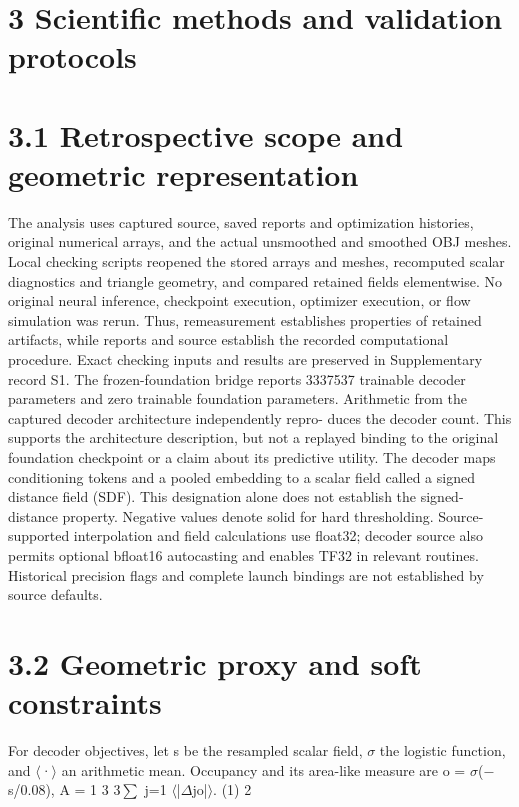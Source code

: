 \documentclass[11pt]{article}
\begin{document}
\section*{3 Scientific methods and validation protocols}


\section*{3.1 Retrospective scope and geometric representation}

The analysis uses captured source, saved reports and optimization histories, original numerical
arrays, and the actual unsmoothed and smoothed OBJ meshes. Local checking scripts reopened
the stored arrays and meshes, recomputed scalar diagnostics and triangle geometry, and compared
retained fields elementwise. No original neural inference, checkpoint execution, optimizer execution,
or flow simulation was rerun. Thus, remeasurement establishes properties of retained artifacts,
while reports and source establish the recorded computational procedure. Exact checking inputs
and results are preserved in Supplementary record S1.
The frozen-foundation bridge reports 3337537 trainable decoder parameters and zero trainable
foundation parameters. Arithmetic from the captured decoder architecture independently repro-
duces the decoder count. This supports the architecture description, but not a replayed binding
to the original foundation checkpoint or a claim about its predictive utility. The decoder maps
conditioning tokens and a pooled embedding to a scalar field called a signed distance field (SDF).
This designation alone does not establish the signed-distance property. Negative values denote solid
for hard thresholding. Source-supported interpolation and field calculations use float32; decoder
source also permits optional bfloat16 autocasting and enables TF32 in relevant routines. Historical
precision flags and complete launch bindings are not established by source defaults.

\section*{3.2 Geometric proxy and soft constraints}

For decoder objectives, let s be the resampled scalar field, \ensuremath{\sigma} the logistic function, and \ensuremath{\langle}·\ensuremath{\rangle} an
arithmetic mean. Occupancy and its area-like measure are
o = \ensuremath{\sigma}(\ensuremath{-}s/0.08), A = 1
3
3\ensuremath{\sum}
j=1
\ensuremath{\langle}|\ensuremath{\Delta}jo|\ensuremath{\rangle}. (1)
2
\end{document}
